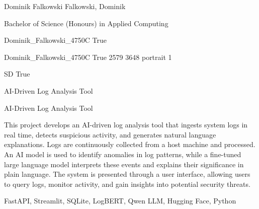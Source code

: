
\begingroup{}\relax



\def\Key{Dominik_Falkowski_4750C}

{Dominik Falkowski}
{Falkowski, Dominik}

{Bachelor of Science (Honours) in Applied Computing}

{Dominik_Falkowski_4750C}
{True}

{Dominik_Falkowski_4750C}
{True}
{2579}
{3648}
{portrait}
{1}

{SD}
{True}

{AI-Driven Log Analysis Tool}

{AI-Driven Log Analysis Tool}

{This project develops an AI-driven log analysis tool that ingests system logs in real time, detects suspicious activity, and generates natural language explanations. Logs are continuously collected from a host machine and processed. An AI model is used to identify anomalies in log patterns, while a fine-tuned large language model interprets these events and explains their significance in plain language. The system is presented through a user interface, allowing users to query logs, monitor activity, and gain insights into potential security threats.}

{FastAPI, Streamlit, SQLite, LogBERT, Qwen LLM, Hugging Face, Python}

